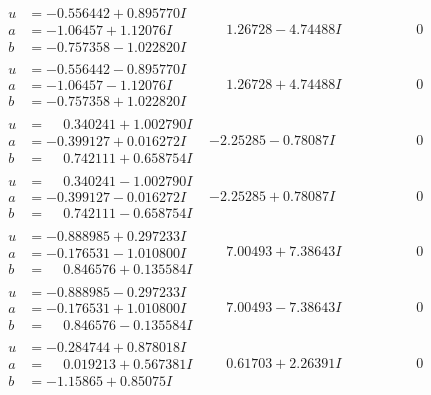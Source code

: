 \documentclass[1p]{elsarticle_modified}
\theoremstyle{definition}
\begin{document}
$$\begin{array}{c|c|c}
\begin{aligned}
u &= -0.556442 + 0.895770 I \\
a &= -1.06457 + 1.12076 I \\
b &= -0.757358 - 1.022820 I\end{aligned}
 & \phantom{-}1.26728 - 4.74488 I & \phantom{-0.000000 } 0 \\ \hline\begin{aligned}
u &= -0.556442 - 0.895770 I \\
a &= -1.06457 - 1.12076 I \\
b &= -0.757358 + 1.022820 I\end{aligned}
 & \phantom{-}1.26728 + 4.74488 I & \phantom{-0.000000 } 0 \\ \hline\begin{aligned}
u &= \phantom{-}0.340241 + 1.002790 I \\
a &= -0.399127 + 0.016272 I \\
b &= \phantom{-}0.742111 + 0.658754 I\end{aligned}
 & -2.25285 - 0.78087 I & \phantom{-0.000000 } 0 \\ \hline\begin{aligned}
u &= \phantom{-}0.340241 - 1.002790 I \\
a &= -0.399127 - 0.016272 I \\
b &= \phantom{-}0.742111 - 0.658754 I\end{aligned}
 & -2.25285 + 0.78087 I & \phantom{-0.000000 } 0 \\ \hline\begin{aligned}
u &= -0.888985 + 0.297233 I \\
a &= -0.176531 - 1.010800 I \\
b &= \phantom{-}0.846576 + 0.135584 I\end{aligned}
 & \phantom{-}7.00493 + 7.38643 I & \phantom{-0.000000 } 0 \\ \hline\begin{aligned}
u &= -0.888985 - 0.297233 I \\
a &= -0.176531 + 1.010800 I \\
b &= \phantom{-}0.846576 - 0.135584 I\end{aligned}
 & \phantom{-}7.00493 - 7.38643 I & \phantom{-0.000000 } 0 \\ \hline\begin{aligned}
u &= -0.284744 + 0.878018 I \\
a &= \phantom{-}0.019213 + 0.567381 I \\
b &= -1.15865 + 0.85075 I\end{aligned}
 & \phantom{-}0.61703 + 2.26391 I & \phantom{-0.000000 } 0 \\ \hline\begin{aligned}

\end{aligned}
\end{array}$$
\end{document}
